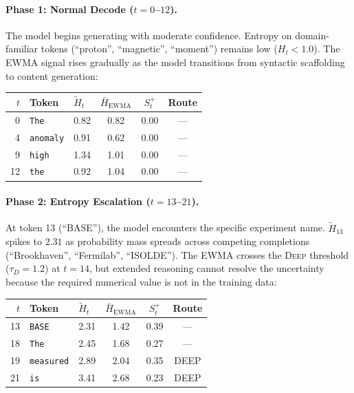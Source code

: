 \documentclass[11pt,a4paper]{article}
\begin{document}
\paragraph{Phase 1: Normal Decode ($t{=}0$--$12$).}
The model begins generating with moderate confidence. Entropy on domain-familiar tokens (``proton'', ``magnetic'', ``moment'') remains low ($H_t < 1.0$). The EWMA signal rises gradually as the model transitions from syntactic scaffolding to content generation:

\begin{center}
\small
\begin{tabular}{@{}rllccc@{}}
\toprule
$t$ & \textbf{Token} & $\tilde{H}_t$ & $\bar{H}_{\text{EWMA}}$ & $S_t^+$ & \textbf{Route} \\
\midrule
0  & \texttt{The}       & 0.82 & 0.82 & 0.00 & --- \\
4  & \texttt{anomaly}   & 0.91 & 0.62 & 0.00 & --- \\
9  & \texttt{high}      & 1.34 & 1.01 & 0.00 & --- \\
12 & \texttt{the}       & 0.92 & 1.04 & 0.00 & --- \\
\bottomrule
\end{tabular}
\end{center}

\paragraph{Phase 2: Entropy Escalation ($t{=}13$--$21$).}
At token 13 (``BASE''), the model encounters the specific experiment name. $\tilde{H}_{13}$ spikes to $2.31$ as probability mass spreads across competing completions (``Brookhaven'', ``Fermilab'', ``ISOLDE''). The EWMA crosses the \textsc{Deep} threshold ($\tau_D{=}1.2$) at $t{=}14$, but extended reasoning cannot resolve the uncertainty because the required numerical value is not in the training data:

\begin{center}
\small
\begin{tabular}{@{}rllccc@{}}
\toprule
$t$ & \textbf{Token} & $\tilde{H}_t$ & $\bar{H}_{\text{EWMA}}$ & $S_t^+$ & \textbf{Route} \\
\midrule
13 & \texttt{BASE}           & 2.31 & 1.42 & 0.39 & --- \\
18 & \texttt{The}            & 2.45 & 1.68 & 0.27 & --- \\
19 & \texttt{measured}       & 2.89 & 2.04 & 0.35 & DEEP \\
21 & \texttt{is}             & 3.41 & 2.68 & 0.23 & DEEP \\
\bottomrule
\end{tabular}
\end{center}
\end{document}

